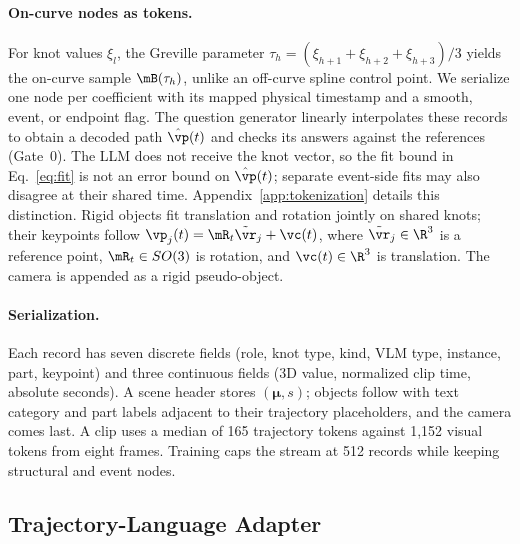 \paragraph{On-curve nodes as tokens.}
For knot values $\xi_l$, the Greville parameter $\tau_h=(\xi_{h+1}+\xi_{h+2}+\xi_{h+3})/3$ yields the on-curve sample $\mB(\tau_h)$, unlike an off-curve spline control point. We serialize one node per coefficient with its mapped physical timestamp and a smooth, event, or endpoint flag. The question generator linearly interpolates these records to obtain a decoded path $\hat{\vp}(t)$ and checks its answers against the references (Gate~0). The LLM does not receive the knot vector, so the fit bound in Eq.~\ref{eq:fit} is not an error bound on $\hat{\vp}(t)$; separate event-side fits may also disagree at their shared time. Appendix~\ref{app:tokenization} details this distinction. Rigid objects fit translation and rotation jointly on shared knots; their keypoints follow $\vp_j(t)=\mR_t\tilde{\vr}_j+\vc(t)$, where $\tilde{\vr}_j\in\R^3$ is a reference point, $\mR_t\in SO(3)$ is rotation, and $\vc(t)\in\R^3$ is translation. The camera is appended as a rigid pseudo-object.

\paragraph{Serialization.}
Each record has seven discrete fields (role, knot type, kind, VLM type, instance, part, keypoint) and three continuous fields (3D value, normalized clip time, absolute seconds). A scene header stores $(\boldsymbol{\mu},s)$; objects follow with text category and part labels adjacent to their trajectory placeholders, and the camera comes last. A clip uses a median of 165 trajectory tokens against 1,152 visual tokens from eight frames. Training caps the stream at 512 records while keeping structural and event nodes.

\subsection{Trajectory-Language Adapter}
\label{sec:train}


